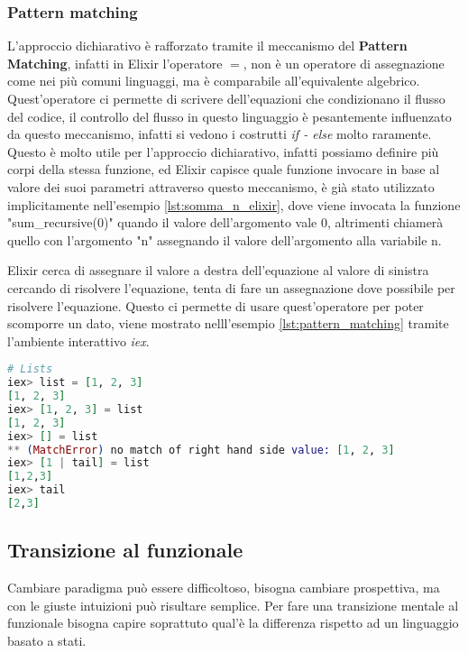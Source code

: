 \subsubsection{Pattern matching}

L'approccio dichiarativo è rafforzato tramite il meccanismo
del \textbf{Pattern Matching}, infatti in Elixir l'operatore $=$,
non è un operatore di assegnazione come nei più comuni linguaggi,
ma è comparabile all'equivalente algebrico.
Quest'operatore ci permette di scrivere dell'equazioni
che condizionano il flusso del codice, il controllo del flusso
in questo linguaggio è pesantemente influenzato da questo meccanismo,
infatti si vedono i costrutti \textit{if - else} molto raramente.
Questo è molto utile per l'approccio
dichiarativo, infatti possiamo definire più corpi della stessa funzione,
ed Elixir capisce quale funzione invocare in base
al valore dei suoi parametri attraverso questo meccanismo,
è già stato utilizzato implicitamente nell'esempio \ref{lst:somma_n_elixir},
dove viene invocata la funzione "sum\_recursive(0)" quando
il valore dell'argomento vale 0, altrimenti chiamerà quello
con l'argomento "n" assegnando il valore dell'argomento alla variabile n.

Elixir cerca di assegnare il valore a destra dell'equazione
al valore di sinistra cercando di risolvere l'equazione, tenta
di fare un assegnazione dove possibile per risolvere l'equazione.
Questo ci permette di usare quest'operatore per poter
scomporre un dato, viene mostrato nelll'esempio \ref{lst:pattern_matching}
tramite l'ambiente interattivo \textit{iex}.

\begin{lstlisting}[language=elixir, caption={Pattern Matching},captionpos=b,
	label={lst:pattern_matching}]
# Lists
iex> list = [1, 2, 3]
[1, 2, 3]
iex> [1, 2, 3] = list
[1, 2, 3]
iex> [] = list
** (MatchError) no match of right hand side value: [1, 2, 3]
iex> [1 | tail] = list
[1,2,3]
iex> tail
[2,3]
\end{lstlisting}


\subsection{Transizione al funzionale}

Cambiare paradigma può essere difficoltoso, bisogna
cambiare prospettiva, ma con le giuste intuizioni
può risultare semplice. Per fare una transizione mentale al funzionale
bisogna capire soprattuto qual'è la differenza rispetto ad un
linguaggio basato a stati.

